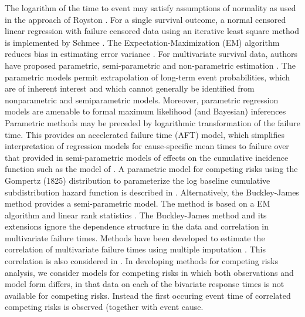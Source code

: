 \documentclass[twoside,a4paper,12pt]{article}
\theoremstyle{plain}
\theoremstyle{definition}
\begin{document}
The logarithm of the time to event may satisfy assumptions of normality as used 
in the approach of Royston \citep{Royston2006}. 
For a single survival outcome, a normal censored linear regression with failure 
censored data using an iterative least square method is implemented by Schmee 
\citep{Schmee1979}. 
The Expectation-Maximization (EM) algorithm \citep{Dempster1977} reduces bias in 
estimating error variance \citep{Aitkin1981}.
For multivariate survival data, authors have proposed parametric, 
semi-parametric and non-parametric estimation \citep{Hougaard}. 
The parametric models permit extrapolation of long-term event probabilities, 
which are of inherent interest and which cannot generally be identified from nonparametric and semiparametric models. 
Moreover, parametric regression models are amenable to formal maximum likelihood (and Bayesian) inferences
Parametric methods may be preceded by logarithmic transformation of the failure time.
This provides an accelerated failure time (AFT) model, which simplifies interpretation 
of regression models for cause-specific mean times to failure 
over that provided in semi-parametric models of effects on the cumulative incidence function such as the model of \cite{Fine1999}.
A parametric model for competing risks using the Gompertz (1825) distribution to parameterize the log baseline cumulative
subdistribution hazard function is described in \citep{Jeong2007}.
Alternatively, the Buckley-James method \citep{Buckley1979,Lin1992,Jin2006} 
provides a semi-parametric model. The method is based on a EM algorithm and %
linear rank statistics \citep{Louis1981}.
The Buckley-James method and its extensions \citep{Lin1992} ignore the dependence 
structure in the data and correlation in multivariate failure times.  
Methods have been developed  to estimate the correlation of multivariate failure 
times using multiple imputation \citep{Pan1999}. 
This correlation is also considered in \citep{Jin2006}. 
In developing methods for competing risks analysis, 
we consider models for competing risks in which both observations and model form differs, 
in that %
data on each of the bivariate response times is not available for competing risks.
Instead the first occuring event time of correlated competing risks is observed (together with event cause. \\
\end{document}
